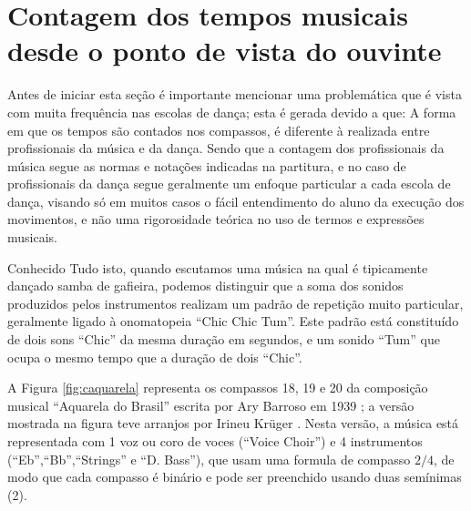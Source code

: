 \section{Contagem dos tempos musicais desde o ponto de vista do ouvinte}
Antes de iniciar esta seção é importante mencionar uma
problemática que é vista com muita frequência nas escolas de dança; esta é gerada devido a que: A forma em que os tempos são contados 
nos compassos, é
diferente à realizada entre profissionais da música e da dança. 
Sendo que a contagem dos profissionais da música segue as normas
e notações indicadas na partitura, e no caso de profissionais da dança segue geralmente um enfoque 
particular a cada escola de dança, visando só em muitos casos o fácil entendimento do aluno da
execução dos movimentos, e não uma rigorosidade teórica no uso de termos e 
expressões musicais.

Conhecido Tudo isto,
quando escutamos uma música na qual é tipicamente dançado samba de gafieira,
podemos distinguir que a soma dos sonidos produzidos pelos instrumentos realizam 
um padrão de repetição muito particular, geralmente ligado à onomatopeia ``Chic Chic Tum''.
Este padrão está constituído de dois sons ``Chic'' da mesma duração em segundos, 
e um sonido ``Tum'' que ocupa o mesmo tempo que a duração de dois ``Chic''.


A Figura \ref{fig:caquarela} representa os compassos 18, 19 e 20 da  
composição musical ``Aquarela do Brasil'' escrita
por Ary Barroso em 1939 \cite{AquarelaDoBrasil}; 
a versão mostrada na figura teve arranjos por Irineu Krüger \cite{Irineu}. 
Nesta versão, a música está representada com 1 voz ou coro de voces (``Voice Choir'') e 4 
instrumentos (``Eb'',``Bb'',``Strings'' e ``D. Bass''), que usam uma 
formula de compasso $2/4$, de modo que cada compasso
é binário e
pode ser preenchido usando duas semínimas (2\quarternote).

